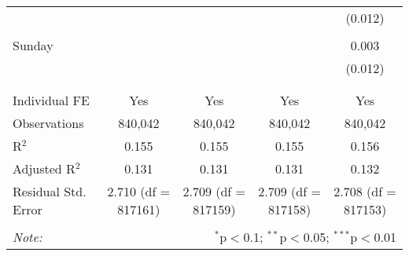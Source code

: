 \documentclass[
]{article}
\begin{document}
\begin{table}[!htbp]
{\begin{tabular}{@{\extracolsep{5pt}}lcccc}
  &  &  &  & (0.012) \\ 
  & & & & \\ 
 Sunday &  &  &  & 0.003 \\ 
  &  &  &  & (0.012) \\ 
  & & & & \\ 
\hline \\[-1.8ex] 
Individual FE & Yes & Yes & Yes & Yes \\ 
Observations & 840,042 & 840,042 & 840,042 & 840,042 \\ 
R$^{2}$ & 0.155 & 0.155 & 0.155 & 0.156 \\ 
Adjusted R$^{2}$ & 0.131 & 0.131 & 0.131 & 0.132 \\ 
Residual Std. Error & 2.710 (df = 817161) & 2.709 (df = 817159) & 2.709 (df = 817158) & 2.708 (df = 817153) \\ 
\hline 
\hline \\[-1.8ex] 
\textit{Note:}  & \multicolumn{4}{r}{$^{*}$p$<$0.1; $^{**}$p$<$0.05; $^{***}$p$<$0.01} \\ 
\end{tabular}
} 
\end{table} 
\newpage
\end{document}
